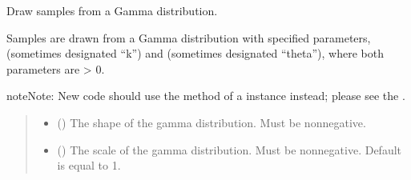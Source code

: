 \documentclass[letterpaper,10pt,english]{sphinxmanual}
\begin{document}
\begin{fulllineitems}
\label{\detokenize{metilda.controllers:metilda.controllers.pitch_art_wizard.gamma}}
\pysigstartsignatures
{}
\pysigstopsignatures
\sphinxAtStartPar
Draw samples from a Gamma distribution.

\sphinxAtStartPar
Samples are drawn from a Gamma distribution with specified parameters,
 (sometimes designated “k”) and  (sometimes designated
“theta”), where both parameters are \textgreater{} 0.

\begin{sphinxadmonition}{note}{Note:}
\sphinxAtStartPar
New code should use the 
method of a  instance instead;
please see the .
\end{sphinxadmonition}
\begin{quote}\begin{description}
\begin{itemize}
\item {} 
\sphinxAtStartPar
{} () \textendash{} The shape of the gamma distribution. Must be non\sphinxhyphen{}negative.

\item {} 
\sphinxAtStartPar
{} (\sphinxstyleliteralemphasis{\sphinxupquote{, }}) \textendash{} The scale of the gamma distribution. Must be non\sphinxhyphen{}negative.
Default is equal to 1.


\end{itemize}
\end{description}
\end{quote}
\end{fulllineitems}
\end{document}
